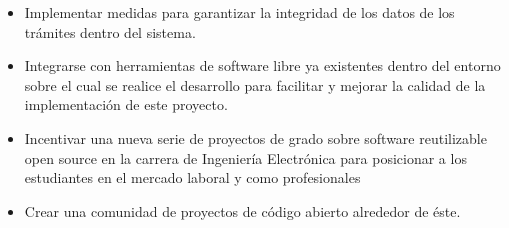 \begin{itemize}
	\item Implementar medidas para garantizar la integridad de los datos de los
		trámites dentro del sistema.
	
	\item Integrarse con herramientas de software libre ya existentes dentro del
		entorno sobre el cual se realice el desarrollo para facilitar y mejorar
		la calidad de la implementación de este proyecto.
	
	\item Incentivar una nueva serie de proyectos de grado sobre software
		reutilizable open source en la carrera de Ingeniería Electrónica para
		posicionar a los estudiantes en el mercado laboral y como profesionales
	
	\item Crear una comunidad de proyectos de código abierto alrededor de éste.
\end{itemize}